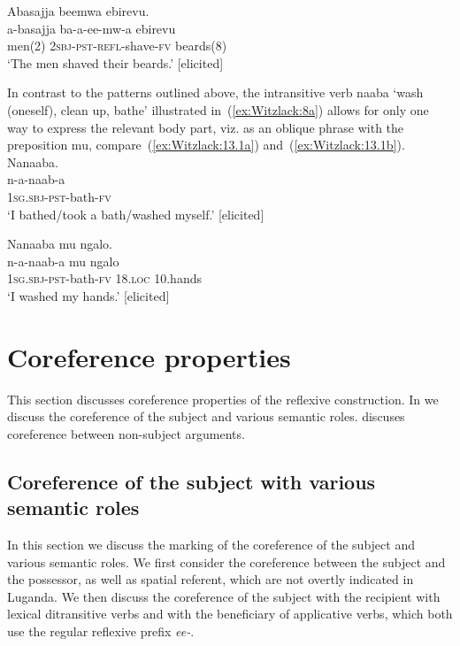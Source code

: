 \documentclass[output=paper,colorlinks,citecolor=brown,
]{langscibook}
\begin{document}
\ex \label{ex:Witzlack:12c}
    \glll Abasajja beemwa ebirevu.\\
    a-basajja ba-a-ee-mw-a 	ebirevu \\
    men(2) \textsc{2sbj}-\textsc{pst}-\textsc{refl}-shave-\textsc{fv} 	beards(8)\\
    \glt ‘The men shaved their beards.’ [elicited]

\z 
\z

In contrast to the patterns outlined above, the intransitive verb naaba ‘wash (oneself), clean up, bathe’ illustrated in~(\ref{ex:Witzlack:8a}) allows for only one way to express the relevant body part, viz. as an oblique phrase with the preposition mu, compare~(\ref{ex:Witzlack:13.1a}) and~(\ref{ex:Witzlack:13.1b}).
\ea\label{ex:Witzlack:13.1}
\ea \label{ex:Witzlack:13.1a}
    \glll	Nanaaba.\\
    n-a-naab-a\\
    \textsc{1sg.sbj}-\textsc{pst}-bath-\textsc{fv}\\
    \glt ‘I bathed/took a bath/washed myself.’ [elicited]

\ex \label{ex:Witzlack:13.1b}
    \glll Nanaaba mu ngalo.\\
    n-a-naab-a	mu	ngalo\\
    \textsc{1sg.sbj}-\textsc{pst}-bath-\textsc{fv}	\textsc{18.loc}	10.hands\\
    \glt ‘I washed my hands.’ [elicited]

\z 
\z

\section{Coreference properties}\label{sec:Witzlack:4}
 
This section discusses coreference properties of the reflexive construction. In  we discuss the coreference of the subject and various semantic roles. 
 discuses coreference between non-subject arguments.

\subsection{Coreference of the subject with various semantic roles}\label{sec:Witzlack:4.1}


In this section we discuss the marking of the coreference of the subject and various semantic roles. 
We first consider the coreference between the subject and the possessor, as well as spatial referent, which are not overtly indicated in Luganda. 
We then discuss the coreference of the subject with the recipient with lexical ditransitive verbs and with the beneficiary of applicative verbs, which both use the regular reflexive prefix \emph{ee-}.
\end{document}
